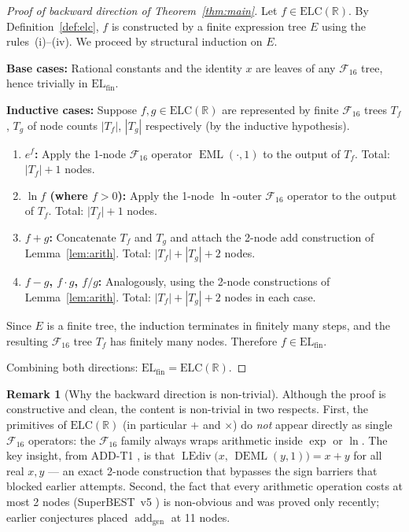 \documentclass[12pt,a4paper]{article}
\theoremstyle{definition}
\newtheorem{remark}[theorem]{Remark}
\newcommand{\EML}{\operatorname{EML}}
\newcommand{\DEML}{\operatorname{DEML}}
\newcommand{\LEdiv}{\operatorname{LEdiv}}
\newcommand{\F}{\mathcal{F}_{16}}
\newcommand{\ELfin}{\mathrm{EL}_{\mathrm{fin}}}
\newcommand{\ELC}{\mathrm{ELC}(\mathbb{R})}
\newcommand{\addop}{\operatorname{add}}
\begin{document}
\begin{proof}[Proof of backward direction of Theorem~\ref{thm:main}]
Let $f\in\ELC$.  By Definition~\ref{def:elc}, $f$ is constructed by a finite
expression tree $E$ using the rules~(i)--(iv).  We proceed by structural
induction on $E$.

\textbf{Base cases:}  Rational constants and the identity $x$ are leaves of
any $\F$ tree, hence trivially in $\ELfin$.

\textbf{Inductive cases:}  Suppose $f,g\in\ELC$ are represented by finite
$\F$ trees $T_f$, $T_g$ of node counts $|T_f|$, $|T_g|$ respectively (by
the inductive hypothesis).

\begin{enumerate}
  \item \textbf{$e^f$:}  Apply the 1-node $\F$ operator $\EML(\cdot,1)$
        to the output of $T_f$.  Total: $|T_f|+1$ nodes.
  \item \textbf{$\ln f$ (where $f>0$):}  Apply the 1-node $\ln$-outer $\F$
        operator to the output of $T_f$.  Total: $|T_f|+1$ nodes.
  \item \textbf{$f+g$:}  Concatenate $T_f$ and $T_g$ and attach the 2-node
        add construction of Lemma~\ref{lem:arith}.  Total: $|T_f|+|T_g|+2$
        nodes.
  \item \textbf{$f-g$, $f\cdot g$, $f/g$:}  Analogously, using the 2-node
        constructions of Lemma~\ref{lem:arith}.  Total: $|T_f|+|T_g|+2$
        nodes in each case.
\end{enumerate}

Since $E$ is a finite tree, the induction terminates in finitely many steps,
and the resulting $\F$ tree $T_f$ has finitely many nodes.  Therefore
$f\in\ELfin$.

Combining both directions: $\ELfin=\ELC$.
\end{proof}

\begin{remark}[Why the backward direction is non-trivial]
Although the proof is constructive and clean, the content is non-trivial in
two respects.  First, the primitives of $\ELC$ (in particular $+$ and $\times$)
do \emph{not} appear directly as single $\F$ operators: the $\F$ family always
wraps arithmetic inside $\exp$ or $\ln$.  The key insight, from ADD-T1
\cite{ADD-T1}, is that $\LEdiv\!\bigl(x,\,\DEML(y,1)\bigr)=x+y$ for all
real $x,y$ --- an exact 2-node construction that bypasses the sign barriers
that blocked earlier attempts.  Second, the fact that every arithmetic
operation costs at most 2 nodes (SuperBEST~v5 \cite{SB5}) is non-obvious and
was proved only recently; earlier conjectures placed $\addop_{\mathrm{gen}}$
at 11 nodes.
\end{remark}
\end{document}

